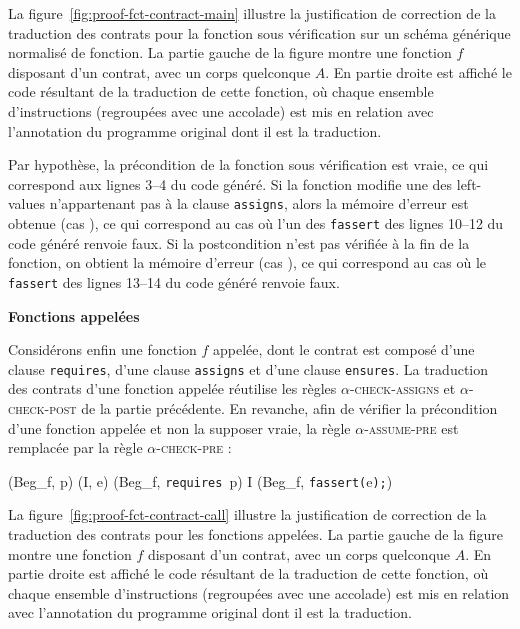 La figure~\ref{fig:proof-fct-contract-main} illustre la justification de
correction de la traduction des contrats pour la fonction sous vérification sur
un schéma générique normalisé de fonction.
La partie gauche de la figure montre une fonction $f$ disposant d'un
contrat, avec un corps quelconque $A$.
En partie droite est affiché le code résultant de la traduction de cette
fonction, où chaque ensemble d'instructions (regroupées avec une accolade) est
mis en relation avec l'annotation du programme original dont il est la
traduction.

Par hypothèse, la précondition de la fonction sous vérification est vraie, ce
qui correspond aux lignes 3--4 du code généré.
Si la fonction modifie une des left-values n'appartenant pas à la clause
\lstinline'assigns', alors la mémoire d'erreur est obtenue (cas ),
ce qui correspond au cas où l'un des \lstinline'fassert' des lignes 10--12 du
code généré renvoie faux.
Si la postcondition n'est pas vérifiée à la fin de la fonction, on obtient
la mémoire d'erreur (cas ), ce qui correspond au cas où le
\lstinline'fassert' des lignes 13--14 du code généré renvoie faux.


\textbf{Fonctions appelées}



Considérons enfin une fonction $f$ appelée, dont le contrat est
composé d'une clause \lstinline'requires', d'une clause \lstinline'assigns' et
d'une clause \lstinline'ensures'.
La traduction des contrats d'une fonction appelée réutilise les règles
\textsc{$\alpha$-check-assigns} et \textsc{$\alpha$-check-post} de la partie
précédente.
En revanche, afin de vérifier la précondition d'une fonction appelée et non la
supposer vraie, la règle \textsc{$\alpha$-assume-pre} est remplacée par la règle
\textsc{$\alpha$-check-pre} :

{\scriptsize
  {
    {(Beg_f, p) \prule (I, e)}
    {(Beg_f, \mbox{\lstinline'requires'}~p\semicolon)
      \arule
      I \concat (Beg_f, \mbox{\lstinline'fassert('}e\mbox{\lstinline');'})
    }{}
  }
}

La figure~\ref{fig:proof-fct-contract-call} illustre la justification de
correction de la traduction des contrats pour les fonctions appelées.
La partie gauche de la figure montre une fonction $f$ disposant d'un
contrat, avec un corps quelconque $A$.
En partie droite est affiché le code résultant de la traduction de cette
fonction, où chaque ensemble d'instructions (regroupées avec une accolade) est
mis en relation avec l'annotation du programme original dont il est la
traduction.

